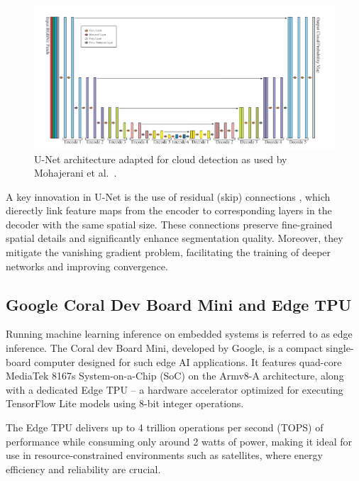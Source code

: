 {\begin{figure}[H]
  \centering
  \includegraphics[width=\textwidth]{files/U-Net_cloud_detection.png}
  \caption{U-Net architecture adapted for cloud detection as used by Mohajerani et al.~\cite{mohajerani2019cloudnet}.}
  \label{fig:unet-architecture}
\end{figure}


A key innovation in U-Net is the use of residual (skip) connections \cite{he2015deepresiduallearningimage}, which dierectly link feature maps from the encoder to corresponding layers in the decoder with the same spatial size. These connections preserve fine-grained spatial details and significantly enhance segmentation quality. Moreover, they mitigate the vanishing gradient problem, facilitating the training of deeper networks and improving convergence.

\subsection{Google Coral Dev Board Mini and Edge TPU}

Running machine learning inference on embedded systems is referred to as edge inference. The Coral dev Board Mini, developed by Google, is a compact single-board computer designed for such edge AI applications. It features quad-core MediaTek 8167s System-on-a-Chip (SoC) on the Armv8-A architecture, along with a dedicated Edge TPU – a hardware accelerator optimized for executing TensorFlow Lite models using 8-bit integer operations.

The Edge TPU delivers up to 4 trillion operations per second (TOPS) of performance while consuming only around 2 watts of power, making it ideal for use in resource-constrained environments such as satellites, where energy efficiency and reliability are crucial.

}
